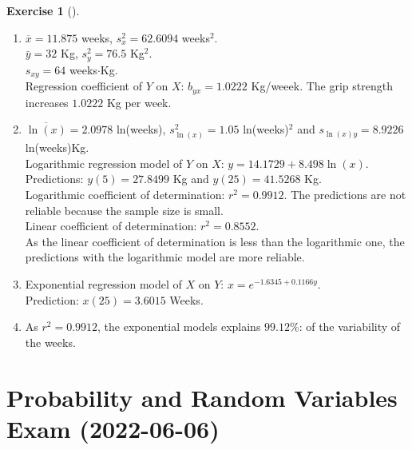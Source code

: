 \documentclass[
  a4paper,
]{scrreport}
\theoremstyle{definition}
\newtheorem{exercise}{Exercise}[chapter]
\theoremstyle{remark}
\begin{document}
\begin{exercise}[]
\begin{tcolorbox}
\begin{enumerate}
\def\labelenumi{\alph{enumi}.}
\item
  \(\overline{x}=11.875\) weeks, \(s_x^2=62.6094\) weeks\(^2\).\\
  \(\bar y=32\) Kg, \(s_y^2=76.5\) Kg\(^2\).\\
  \(s_{xy}=64\) weeks\(\cdot\)Kg.\\
  Regression coefficient of \(Y\) on \(X\): \(b_{yx} = 1.0222\)
  Kg/weeek. The grip strength increases \(1.0222\) Kg per week.
\item
  \(\overline{\ln(x)} = 2.0978\) ln(weeks), \(s_{\ln(x)}^2 = 1.05\)
  ln(weeks)\(^2\) and \(s_{\ln(x)y} = 8.9226\) ln(weeks)Kg.\\
  Logarithmic regression model of \(Y\) on \(X\):
  \(y = 14.1729 + 8.498 \ln(x)\).\\
  Predictions: \(y(5) = 27.8499\) Kg and \(y(25) = 41.5268\) Kg.\\
  Logarithmic coefficient of determination: \(r^2 = 0.9912\). The
  predictions are not reliable because the sample size is small.\\
  Linear coefficient of determination: \(r^2 = 0.8552\).\\
  As the linear coefficient of determination is less than the
  logarithmic one, the predictions with the logarithmic model are more
  reliable.
\item
  Exponential regression model of \(X\) on \(Y\):
  \(x = e^{-1.6345 + 0.1166y}\).\\
  Prediction: \(x(25)=3.6015\) Weeks.
\item
  As \(r^2 = 0.9912\), the exponential models explains \(99.12\)\%: of
  the variability of the weeks.\\
\end{enumerate}

\end{tcolorbox}

\end{exercise}


\hypertarget{probability-and-random-variables-exam-2022-06-06}{%
\chapter{Probability and Random Variables Exam
(2022-06-06)}\label{probability-and-random-variables-exam-2022-06-06}}
\end{document}
